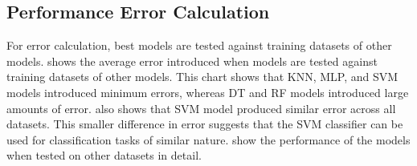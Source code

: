 \subsection{Performance Error Calculation}
For error calculation, best models are tested against training datasets of other models.  shows the average error introduced when models are tested against training datasets of other models. This chart shows that KNN, MLP, and SVM models introduced minimum errors, whereas DT and RF models introduced large amounts of error.  also shows that SVM model produced similar error across all datasets. This smaller difference in error suggests that the SVM classifier can be used for classification tasks of similar nature.  show the performance of the models when tested on other datasets in detail.



